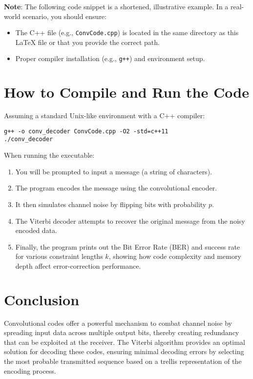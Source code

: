 \documentclass[12pt,a4paper]{article}
\begin{document}
\textbf{Note}: The following code snippet is a shortened, illustrative example. In a real-world scenario, you should ensure:
\begin{itemize}
    \item The C++ file (e.g., \texttt{ConvCode.cpp}) is located in the same directory as this \LaTeX{} file or that you provide the correct path.
    \item Proper compiler installation (e.g., \texttt{g++}) and environment setup.
\end{itemize}



\section{How to Compile and Run the Code}

Assuming a standard Unix-like environment with a C++ compiler:
\begin{verbatim}
g++ -o conv_decoder ConvCode.cpp -O2 -std=c++11
./conv_decoder
\end{verbatim}

When running the executable:
\begin{enumerate}
    \item You will be prompted to input a message (a string of characters).
    \item The program encodes the message using the convolutional encoder.
    \item It then simulates channel noise by flipping bits with probability $p$.
    \item The Viterbi decoder attempts to recover the original message from the noisy encoded data.
    \item Finally, the program prints out the Bit Error Rate (BER) and success rate for various constraint lengths $k$, showing how code complexity and memory depth affect error-correction performance.
\end{enumerate}

\section{Conclusion}

Convolutional codes offer a powerful mechanism to combat channel noise by spreading input data across multiple output bits, thereby creating redundancy that can be exploited at the receiver. The Viterbi algorithm provides an optimal solution for decoding these codes, ensuring minimal decoding errors by selecting the most probable transmitted sequence based on a trellis representation of the encoding process.
\end{document}
